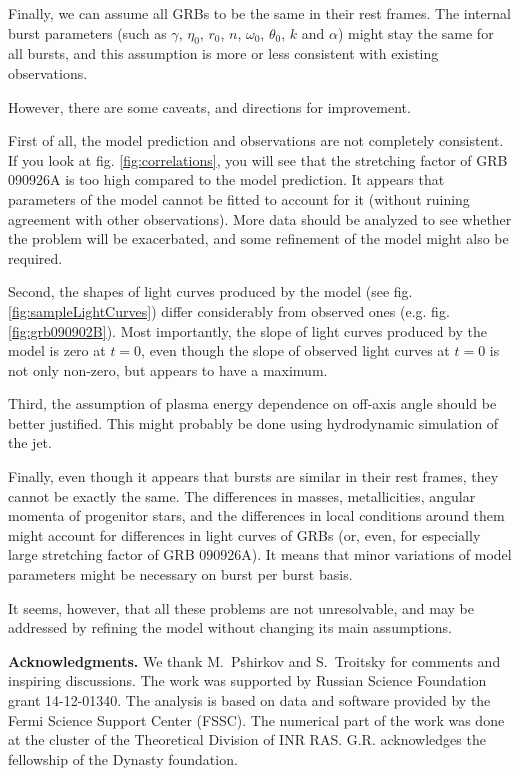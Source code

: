 \documentclass{article}
\begin{document}
	Finally, we can assume all GRBs to be the same in their rest frames.
	The internal burst parameters (such as $\gamma$, $\eta_0$, $r_0$, $n$, $\omega_0$, $\theta_0$, $k$ and $\alpha$) might stay the same for all bursts, and this assumption is more or less consistent with existing observations.

	However, there are some caveats, and directions for improvement.

	First of all, the model prediction and observations are not completely consistent.
	If you look at fig. \ref{fig:correlations}, you will see that the stretching factor of GRB 090926A is too high compared to the model prediction.
	It appears that parameters of the model cannot be fitted to account for it (without ruining agreement with other observations).
	More data should be analyzed to see whether the problem will be exacerbated, and some refinement of the model might also be required.

	Second, the shapes of light curves produced by the model (see fig. \ref{fig:sampleLightCurves}) differ considerably from observed ones (e.g. fig. \ref{fig:grb090902B}).
	Most importantly, the slope of light curves produced by the model is zero at $t = 0$, even though the slope of observed light curves at $t = 0$ is not only non-zero, but appears to have a maximum.

	Third, the assumption of plasma energy dependence on off-axis angle should be better justified.
	This might probably be done using hydrodynamic simulation of the jet.

	Finally, even though it appears that bursts are similar in their rest frames, they cannot be exactly the same.
	The differences in masses, metallicities, angular momenta of progenitor stars, and the differences in local conditions around them might account for differences in light curves of GRBs (or, even, for especially large stretching factor of GRB 090926A).
	It means that minor variations of model parameters might be necessary on burst per burst basis.

It seems, however, that all these problems are not unresolvable, and
may be addressed by refining the model without changing its main
assumptions.

{\bf Acknowledgments.} We thank M.~Pshirkov and S.~Troitsky for
comments and inspiring discussions.  The work was supported by Russian
Science Foundation grant 14-12-01340. The analysis is based on data
and software provided by the Fermi Science Support Center (FSSC). The
numerical part of the work was done at the cluster of the Theoretical
Division of INR RAS. G.R. acknowledges the fellowship of the Dynasty
foundation.
\end{document}
